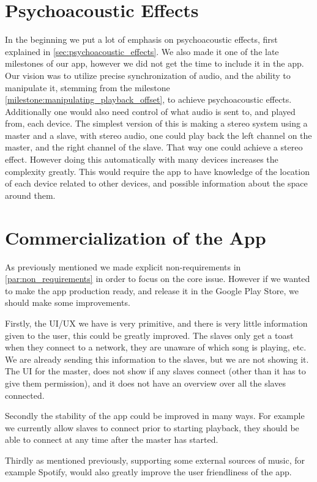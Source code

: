 \section{Psychoacoustic Effects}
In the beginning we put a lot of emphasis on psychoacoustic effects, first explained in \cref{sec:psychoacoustic_effects}.
We also made it one of the late milestones of our app, however we did not get the time to include it in the app.
Our vision was to utilize precise synchronization of audio, and the ability to manipulate it, stemming from the milestone \ref{milestone:manipulating_playback_offset}, to achieve psychoacoustic effects.
Additionally one would also need control of what audio is sent to, and played from, each device.
The simplest version of this is making a stereo system using a master and a slave, with stereo audio, one could play back the left channel on the master, and the right channel of the slave.
That way one could achieve a stereo effect.
However doing this automatically with many devices increases the complexity greatly.
This would require the app to have knowledge of the location of each device related to other devices, and possible information about the space around them.

\section{Commercialization of the App}
As previously mentioned we made explicit non-requirements in \cref{par:non_requirements} in order to focus on the core issue.
However if we wanted to make the app production ready, and release it in the Google Play Store, we should make some improvements.

Firstly, the UI/UX we have is very primitive, and there is very little information given to the user, this could be greatly improved.
The slaves only get a toast when they connect to a network, they are unaware of which song is playing, etc.
We are already sending this information to the slaves, but we are not showing it.
The UI for the master, does not show if any slaves connect (other than it has to give them permission), and it does not have an overview over all the slaves connected.

Secondly the stability of the app could be improved in many ways.
For example we currently allow slaves to connect prior to starting playback, they should be able to connect at any time after the master has started.

Thirdly as mentioned previously, supporting some external sources of music, for example Spotify, would also greatly improve the user friendliness of the app.

